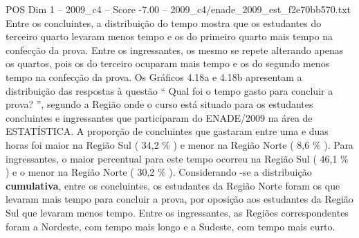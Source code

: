 \begin{textsample}{POS Dim 1 – 2009\_c4 – Score -7.00 – 2009\_c4/enade\_2009\_est\_f2e70bb570.txt}
Entre os concluintes, a distribuição do tempo mostra que os estudantes do terceiro quarto levaram menos tempo e os do primeiro quarto mais tempo na confecção da prova.
Entre os ingressantes, os mesmo se repete alterando apenas os quartos, pois os do terceiro ocuparam mais tempo e os do segundo menos tempo na confecção da prova.
Os Gráficos 4.18a e 4.18b apresentam a distribuição das respostas à questão “ Qual foi o tempo gasto para concluir a prova? ”, segundo a Região onde o curso está situado para os estudantes concluintes e ingressantes que participaram do ENADE/2009 na área de ESTATÍSTICA.
A proporção de concluintes que gastaram entre uma e duas horas foi maior na Região Sul ( 34,2 \% ) e menor na Região Norte ( 8,6 \% ).
Para ingressantes, o maior percentual para este tempo ocorreu na Região Sul ( 46,1 \% ) e o menor na Região Norte ( 30,2 \% ).
Considerando -se a distribuição \textbf{cumulativa}, entre os concluintes, os estudantes da Região Norte foram os que levaram mais tempo para concluir a prova, por oposição aos estudantes da Região Sul que levaram menos tempo.
Entre os ingressantes, as Regiões correspondentes foram a Nordeste, com tempo mais longo e a Sudeste, com tempo mais curto.

\end{textsample}
